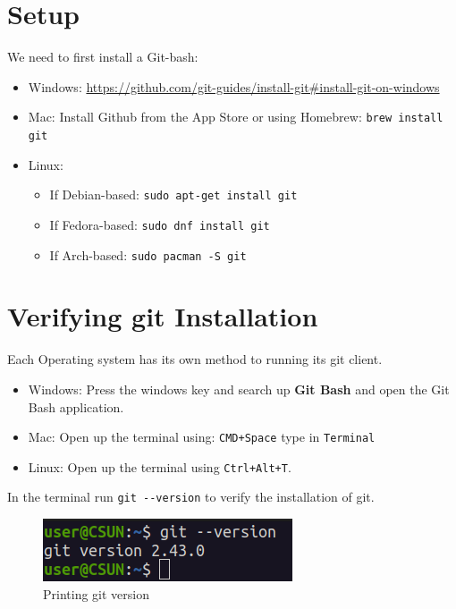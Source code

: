 \documentclass[12pt, a4paper]{article}
\begin{document}
\section{Setup}
We need to first install a Git-bash:\\

\begin{itemize}
    \item Windows: \url{https://github.com/git-guides/install-git#install-git-on-windows}\\
    \item Mac: Install Github from the App Store or using Homebrew:
\verb+brew install git+\\
\item Linux:
    \begin{itemize}
        \item If Debian-based: \verb`sudo apt-get install git` \\
        \item If Fedora-based: \verb`sudo dnf install git`\\
        \item If Arch-based: \verb+sudo pacman -S git+ 
    \end{itemize}
\end{itemize}

\section{Verifying git Installation}

Each Operating system has its own method to running its git client. 
\begin{itemize}
\item Windows: Press the windows key and search up \textbf{Git Bash} and open the Git Bash application.
\item Mac: Open up the terminal using: \texttt{CMD+Space} type in \texttt{Terminal}
\item Linux: Open up the terminal using \texttt{Ctrl+Alt+T}.
\end{itemize}

In the terminal run \verb+git --version+ to verify the installation of git.
\begin{figure}[H]
\centering
\includegraphics[scale=0.75]{../images/workshop-I/git-ver.png}
\caption{Printing git version}
\end{figure}
\end{document}
